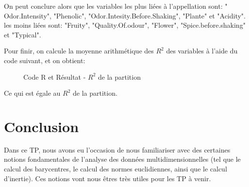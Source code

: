 On peut conclure alors que les variables les plus liées à l'appellation sont: " Odor.Intensity", "Phenolic", "Odor.Intesity.Before.Shaking", "Plante" et "Acidity".
les moins liées sont: "Fruity", "Quality.Of.odour", "Flower", "Spice.before.shaking" et "Typical".

Pour finir, on calcule la moyenne arithmétique des $R^2$ des variables à l'aide du code suivant, et on obtient:

\begin{figure}[h]
\centering
{}
\caption{Code R et Résultat - $R^2$ de la partition}
\end{figure}

Ce qui est égale au $R^2$ de la partition.
\chapter*{Conclusion}
Dans ce TP, nous avons eu l'occasion de nous familiariser avec des certaines notions fondamentales de l'analyse des données multidimensionnelles (tel que le calcul des barycentres, le calcul des normes euclidiennes, ainsi que le calcul d'inertie). Ces notions vont nous êtres très utiles pour les TP à venir.
